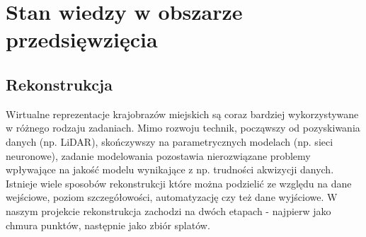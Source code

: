 \section{Stan wiedzy w obszarze przedsięwzięcia}



\subsection{Rekonstrukcja}

Wirtualne reprezentacje krajobrazów miejskich są coraz bardziej wykorzystywane w różnego rodzaju zadaniach. Mimo rozwoju technik, począwszy od pozyskiwania danych (np. LiDAR), skończywszy na parametrycznych modelach (np. sieci neuronowe), zadanie modelowania pozostawia nierozwiązane problemy wpływające na jakość modelu wynikające z np. trudności akwizycji danych. 
Istnieje wiele sposobów rekonstrukcji które można podzielić ze względu na dane wejściowe, poziom szczegółowości, automatyzację czy też dane wyjściowe. W naszym projekcie rekonstrukcja zachodzi na dwóch etapach - najpierw jako chmura punktów, następnie jako zbiór splatów. 

